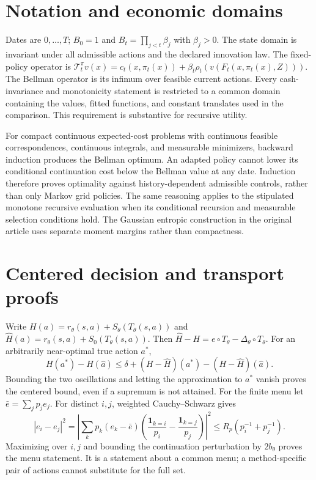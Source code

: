 \documentclass[ecta,nameyear,draft]{econsocart}
\begin{document}
\section{Notation and economic domains}
Dates are $0,\ldots,T$; $B_0=1$ and $B_t=\prod_{j<t}\beta_j$ with $\beta_j>0$. The state domain is invariant under all admissible actions and the declared innovation law. The fixed-policy operator is
$\mathcal T_t^\pi v(x)=c_t(x,\pi_t(x))+\beta_t\rho_t(v(F_t(x,\pi_t(x),Z)))$.
The Bellman operator is its infimum over feasible current actions. Every cash-invariance and monotonicity statement is restricted to a common domain containing the values, fitted functions, and constant translates used in the comparison. This requirement is substantive for recursive utility.

For compact continuous expected-cost problems with continuous feasible correspondences, continuous integrals, and measurable minimizers, backward induction produces the Bellman optimum. An adapted policy cannot lower its conditional continuation cost below the Bellman value at any date. Induction therefore proves optimality against history-dependent admissible controls, rather than only Markov grid policies. The same reasoning applies to the stipulated monotone recursive evaluation when its conditional recursion and measurable selection conditions hold. The Gaussian entropic construction in the original article uses separate moment margins rather than compactness.

\section{Centered decision and transport proofs}
Write $H(a)=r_\theta(s,a)+S_\theta(T_\theta(s,a))$ and
$\widehat H(a)=r_\theta(s,a)+\widehat S_0(T_\theta(s,a))$.
Then $\widehat H-H=e\circ T_\theta-\Delta_\theta\circ T_\theta$.
For an arbitrarily near-optimal true action $a^*$,
\[
 H(a^*)-H(\widehat a)
 \leq\delta+(H-\widehat H)(a^*)-(H-\widehat H)(\widehat a).
\]
Bounding the two oscillations and letting the approximation to $a^*$ vanish proves the centered bound, even if a supremum is not attained. For the finite menu let $\bar e=\sum_jp_je_j$. For distinct $i,j$, weighted Cauchy--Schwarz gives
\[
 |e_i-e_j|^2
 =\left|\sum_kp_k(e_k-\bar e)
       \left(\frac{\mathbf1_{k=i}}{p_i}-\frac{\mathbf1_{k=j}}{p_j}\right)\right|^2
 \leq R_p(p_i^{-1}+p_j^{-1}).
\]
Maximizing over $i,j$ and bounding the continuation perturbation by $2b_\theta$ proves the menu statement. It is a statement about a common menu; a method-specific pair of actions cannot substitute for the full set.
\end{document}
